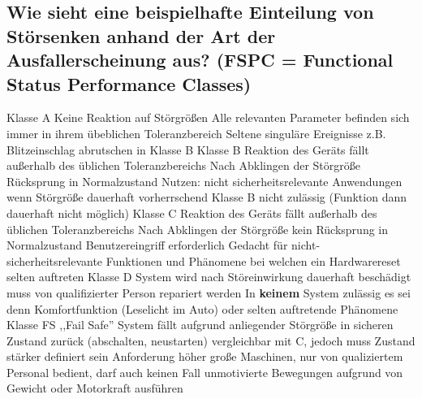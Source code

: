 \subsection{Wie sieht eine beispielhafte Einteilung von Störsenken anhand der Art der Ausfallerscheinung aus? (FSPC = Functional Status Performance Classes)}
\begin{outline}
  \1 Klasse A
    \2 Keine Reaktion auf Störgrößen
    \2 Alle relevanten Parameter befinden sich immer in ihrem übeblichen Toleranzbereich
    \2 Seltene singuläre Ereignisse \m{\rightarrow} z.B. Blitzeinschlag \m{\rightarrow} abrutschen in Klasse B
  \1 Klasse B
    \2 Reaktion des Geräts fällt außerhalb des üblichen Toleranzbereichs
    \2 Nach Abklingen der Störgröße \m{\rightarrow} Rücksprung in Normalzustand
    \2 Nutzen: nicht sicherheitsrelevante Anwendungen \m{\rightarrow} wenn Störgröße dauerhaft vorherrschend \m{\rightarrow} Klasse B nicht zulässig (Funktion dann dauerhaft nicht möglich)
  \1 Klasse C
    \2  Reaktion des Geräts fällt außerhalb des üblichen Toleranzbereichs
    \2 Nach Abklingen der Störgröße \m{\rightarrow} kein Rücksprung in Normalzustand \m{\rightarrow}Benutzereingriff erforderlich
    \2 Gedacht für nicht-sicherheitsrelevante Funktionen \m{\rightarrow} und Phänomene bei welchen ein Hardwarereset selten auftreten
  \1 Klasse D
    \2 System wird nach Störeinwirkung dauerhaft beschädigt \m{\rightarrow} muss von qualifizierter Person repariert werden
    \2 In \textbf{keinem} System zulässig es sei denn \m{\rightarrow} Komfortfunktion (Leselicht im Auto) oder selten auftretende Phänomene
  \1 Klasse FS
    \2 ,,Fail Safe''
    \2 System fällt aufgrund anliegender Störgröße in sicheren Zustand zurück (abschalten, neustarten)
    \2 vergleichbar mit C, jedoch muss Zustand stärker definiert sein \m{\rightarrow} Anforderung höher
    \2 große Maschinen, nur von qualiziertem Personal bedient, darf auch keinen Fall unmotivierte Bewegungen aufgrund von Gewicht oder Motorkraft ausführen
\end{outline}

\pagebreak